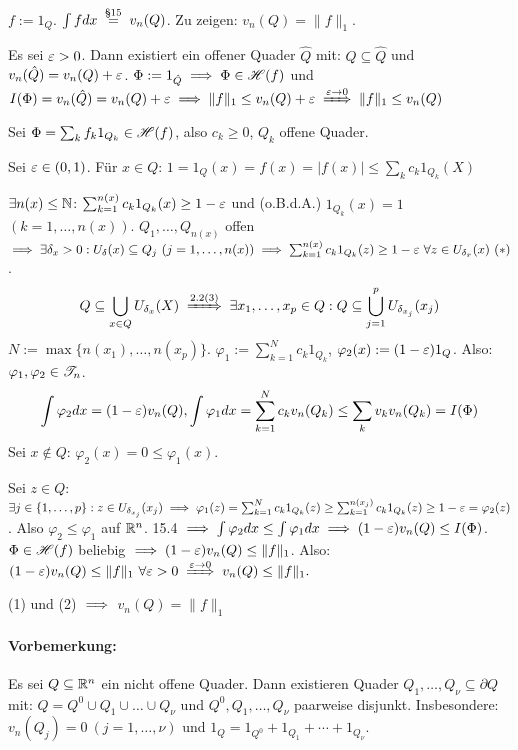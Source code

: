 \documentclass[a4paper,twoside,DIV15,BCOR12mm]{scrbook}
\begin{document}
\begin{beweis}
$f:=1_Q$. $\int f dx \gleichnach{§15} v_n(Q)$. Zu zeigen: $v_n(Q) = \|f\|_1$.
\begin{liste}
\item Es sei $\varepsilon > 0$. Dann existiert ein offener Quader $\hat Q$ mit: $Q\subseteq \hat Q$ und $v_n(\hat Q) = v_n(Q) + \varepsilon$. $\Phi := 1_{\hat Q} \implies \Phi \in\mathscr{H}(f)$ und $I(\Phi) = v_n(\hat Q) = v_n(Q)+\ep \folgt \|f\|_1 \le v_n(Q)+\ep \folgtwegen{\ep \to 0} \|f\|_1 \le v_n(Q)$
\item Sei $\Phi = \sum_{k} f_k1_{Q_k} \in \mathscr{H}(f)$, also $c_k \ge 0$, $Q_k$ offene Quader.

Sei $\varepsilon\in(0,1)$. Für $x\in Q$: $1=1_Q(x) = f(x) = |f(x)| \le \sum_{k} c_k 1_{Q_k}(X)$

$\exists n(x) \le \mathbb{N}$: $\sum_{k=1}^{n(x)} c_k 1_{Q_k}(x) \ge 1-\varepsilon$ und (o.B.d.A.) $1_{Q_k}(x)=1$ $(k=1,\ldots,n(x))$. $Q_1,\ldots,Q_{n(x)}$ offen $\implies \exists \delta_x>0: U_\delta(x)\subseteq Q_j \ (j=1,\ldots,n(x)) \implies \sum_{k=1}^{n(x)} c_k 1_{Q_k}(z) \ge 1-\varepsilon \ \forall z\in U_{\delta_x}(x)\ (*)$.
$$Q\subseteq \bigcup_{x\in Q} U_{\delta_x} (X) \folgtnach{2.2(3)} \exists x_1,\ldots,x_p\in Q: Q\subseteq \bigcup_{j=1}^p U_{\delta_{x_j}}(x_j)$$
$N := \max\{n(x_1), \ldots , n(x_p)\}$. $\varphi_1 := \sum_{k=1}^N c_k 1_{Q_k}$, $\varphi_2(x) := (1-\varepsilon)1_Q$. Also: $\varphi_1,\varphi_2 \in \mathscr{T}_n$.
$$\int \varphi_2dx = (1-\varepsilon)v_n(Q), \int \varphi_1dx = \sum_{k=1}^N c_k v_n(Q_k) \le \sum_{k} v_k v_n(Q_k) = I(\Phi)$$
Sei $x\notin Q$: $\varphi_2(x)=0 \le \varphi_1(x)$.

Sei $z\in Q$: $\exists j\in\{1,\ldots,p\}: z\in U_{\delta_{x_j}} (x_j) \implies \varphi_1(z) = \sum_{k=1}^Nc_k 1_{Q_k}(z) \ge \sum_{k=1}^{n(x_j)} c_k 1_{Q_k}(z) \ge 1-\varepsilon = \varphi_2(z)$. Also $\varphi_2\le \varphi_1$ auf $\mathbb{R}^n$. 15.4 $\implies \int \varphi_2dx \le \int \varphi_1dx \implies (1-\varepsilon)v_n(Q) \le I(\Phi)$. $\Phi\in \mathscr{H}(f)$ beliebig $\implies (1-\varepsilon)v_n(Q) \le \|f\|_1$. Also: $(1-\ep)v_n(Q)\le \|f\|_1 \ \forall \ep > 0 \folgtwegen{\ep \to 0} v_n(Q)\le\|f\|_1.$

\end{liste}
(1) und (2) $\implies$ $v_n(Q) = \|f\|_1$
\end{beweis}


\paragraph{Vorbemerkung:} Es sei $Q\subseteq\mathbb{R}^{n}$ ein nicht offene Quader. Dann existieren Quader $Q_1, \ldots, Q_\nu \subseteq \partial Q$ mit: $Q = Q^0\cup Q_1\cup\ldots\cup Q_\nu$ und $Q^0,Q_1,\ldots,Q_\nu$ paarweise disjunkt. Insbesondere: $v_n(Q_j)=0\ (j=1,\ldots,\nu)$ und $1_Q = 1_{Q^0}+1_{Q_1}+\cdots+1_{Q_\nu}$.
\end{document}
